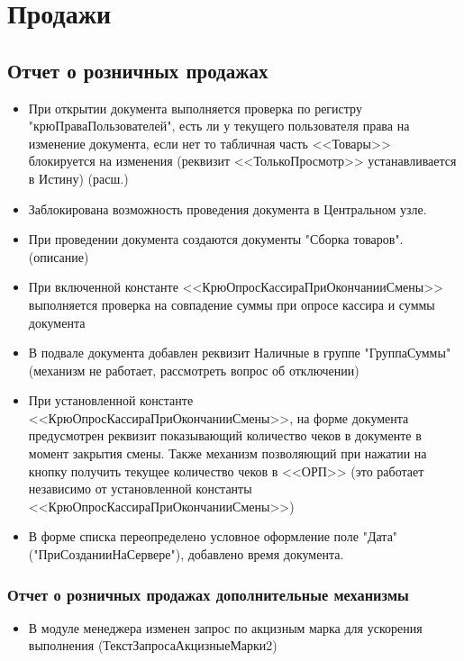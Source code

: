 \section{Продажи}
\subsection{Отчет о розничных продажах}


\begin{itemize}
	\item При открытии документа выполняется проверка по регистру "крюПраваПользователей", есть ли у текущего пользователя права на изменение документа, если нет то табличная часть <<Товары>> блокируется на изменения (реквизит <<ТолькоПросмотр>> устанавливается в Истину) (расш.)
	\item Заблокирована возможность проведения документа в Центральном узле.
	\item При проведении документа создаются документы "Сборка товаров".(описание)
	\item При включенной константе <<КрюОпросКассираПриОкончанииСмены>> выполняется проверка на совпадение суммы при опросе кассира и суммы документа
	\item В подвале документа добавлен реквизит Наличные в группе "ГруппаСуммы" (механизм не работает, рассмотреть вопрос об отключении)
	\item При установленной константе <<КрюОпросКассираПриОкончанииСмены>>,  на форме документа предусмотрен реквизит показывающий количество чеков в документе в момент закрытия смены. Также механизм позволяющий при нажатии на кнопку  получить текущее количество чеков в <<ОРП>> (это работает независимо от установленной константы <<КрюОпросКассираПриОкончанииСмены>>)
	\item В форме списка переопределено условное оформление поле "Дата" ("ПриСозданииНаСервере"), добавлено время документа.


\end{itemize}

\subsubsection{Отчет о розничных продажах дополнительные механизмы}
\begin{itemize}
	\item В модуле менеджера изменен запрос по акцизным марка для ускорения выполнения (ТекстЗапросаАкцизныеМарки2)
\end{itemize}



